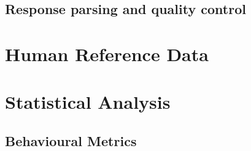 \documentclass[logo,msc]{infthesis}           %
\begin{document}
\hypertarget{response-parsing-and-quality-control}{%
\subsection{Response parsing and quality control}\label{response-parsing-and-quality-control}}

\hypertarget{human-reference-data}{%
\section{Human Reference Data}\label{human-reference-data}}

\hypertarget{statistical-analysis}{%
\section{Statistical Analysis}\label{statistical-analysis}}

\hypertarget{behavioural-metrics}{%
\subsection{Behavioural Metrics}\label{behavioural-metrics}}
\end{document}
